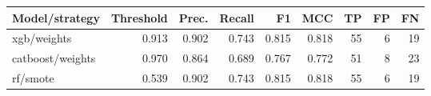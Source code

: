\begin{tabular}{lrrrrrrrr}
\toprule
Model/strategy & Threshold & Prec. & Recall & F1 & MCC & TP & FP & FN \\
\midrule
xgb/weights & 0.913 & 0.902 & 0.743 & 0.815 & 0.818 & 55 & 6 & 19 \\
catboost/weights & 0.970 & 0.864 & 0.689 & 0.767 & 0.772 & 51 & 8 & 23 \\
rf/smote & 0.539 & 0.902 & 0.743 & 0.815 & 0.818 & 55 & 6 & 19 \\
\bottomrule
\end{tabular}
